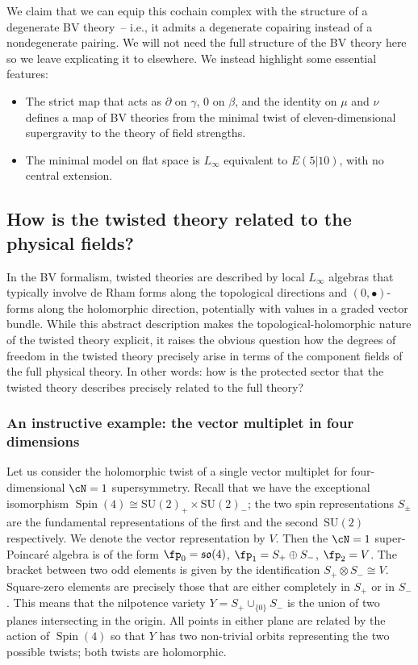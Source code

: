 \documentclass[pdftex]{sigma}
\numberwithin{equation}{section}
\theoremstyle{definition}
\def\lie#1{\ensuremath{\mathfrak{#1}}}
\DeclareMathOperator{\Spin}{Spin}
\def\so{\lie{so}}
\def\SU{\ensuremath{\mathrm{SU}}}
\begin{document}
We claim that we can equip this cochain complex with the structure of a degenerate BV theory~-- i.e., it admits a degenerate copairing instead of a nondegenerate pairing. We will not need the full structure of the BV theory here so we leave explicating it to elsewhere. We instead highlight some essential features:
\begin{itemize}\itemsep=0pt
 \item[--] The strict map that acts as $\partial$ on $\gamma$, $0$ on $\beta$, and the identity on $\mu$ and $\nu$ defines a map of BV theories from the minimal twist of eleven-dimensional supergravity to the theory of field strengths.
 \item[--] The minimal model on flat space is $L_\infty$ equivalent to $E(5|10)$, with no central extension.
\end{itemize}

\subsection{How is the twisted theory related to the physical fields?}
In the BV formalism, twisted theories are described by local $L_\infty$ algebras that typically involve de Rham forms along the topological directions and $(0,\bullet)$-forms along the holomorphic direction, potentially with values in a graded vector bundle. While this abstract description makes the topological-holomorphic nature of the twisted theory explicit, it raises the obvious question how the degrees of freedom in the twisted theory precisely arise in terms of the component fields of the full physical theory. In other words: how is the protected sector that the twisted theory describes precisely related to the full theory?

\subsubsection{An instructive example: the vector multiplet in four dimensions}
Let us consider the holomorphic twist of a single vector multiplet for four-dimensional $\cN=1$ supersymmetry. Recall that we have the exceptional isomorphism $\Spin(4) \cong \SU(2)_+ \times \SU(2)_-$; the two spin representations $S_\pm$ are the fundamental representations of the first and the second~$\SU(2)$ respectively. We denote the vector representation by $V$. Then the $\cN=1$ super-Poincar\'e algebra is of the form
$
 \fp_0 = \so(4)$, $\fp_1 = S_+ \oplus S_- $, $\fp_2 = V$.
The bracket between two odd elements is given by the identification $S_+ \otimes S_- \cong V$. Square-zero elements are precisely those that are either completely in $S_+$ or in $S_-$. This means that the nilpotence variety $Y=S_+ \cup_{\{0\}} S_-$ is the union of two planes intersecting in the origin. All points in either plane are related by the action of $\Spin(4)$ so that $Y$ has two non-trivial orbits representing the two possible twists; both twists are holomorphic.
\end{document}
